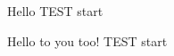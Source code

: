 \begin{frame}{Hello}
 TEST start
\end{frame}

\begin{frame}{Hello to you too!}
 TEST start
\end{frame}
